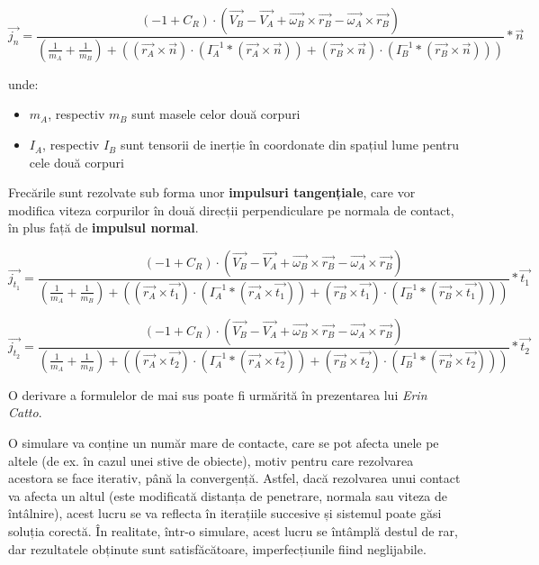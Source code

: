 \documentclass[12pt,a4paper]{report}
\begin{document}
$$ \vec{j_n} = \frac{\left(-1 + C_R\right) \cdot \left( \vec{V_B} - \vec{V_A} + \vec{\omega_B} \times \vec{r_B} - \vec{\omega_A} \times \vec{r_B} \right) }{\left(\frac{1}{m_A} + \frac{1}{m_B} \right) + \left(\left( \vec{r_A} \times \vec{n} \right) \cdot \left( I_{A}^{-1} * \left(\vec{r_A} \times \vec{n}\right)\right) + \left( \vec{r_B} \times \vec{n} \right) \cdot \left( I_{B}^{-1} * \left(\vec{r_B} \times \vec{n}\right)\right)  \right)} * \vec{n} $$

unde:
\begin{itemize}
	\item $m_A$, respectiv $m_B$ sunt masele celor două corpuri
	\item $I_{A}$, respectiv $I_{B}$ sunt tensorii de inerție în coordonate din spațiul lume pentru cele două corpuri
\end{itemize}

Frecările sunt rezolvate sub forma unor \textbf{impulsuri tangențiale}, care vor modifica viteza corpurilor în două direcții perpendiculare pe normala de contact, în plus față de \textbf{impulsul normal}.

$$ \vec{j_{t_1}} = \frac{\left(-1 + C_R\right) \cdot \left( \vec{V_B} - \vec{V_A} + \vec{\omega_B} \times \vec{r_B} - \vec{\omega_A} \times \vec{r_B} \right) }{\left(\frac{1}{m_A} + \frac{1}{m_B} \right) + \left(\left( \vec{r_A} \times \vec{t_1} \right) \cdot \left( I_{A}^{-1} * \left(\vec{r_A} \times \vec{t_1}\right)\right) + \left( \vec{r_B} \times \vec{t_1} \right) \cdot \left( I_{B}^{-1} * \left(\vec{r_B} \times \vec{t_1}\right)\right)  \right)} * \vec{t_1} $$

$$ \vec{j_{t_2}} = \frac{\left(-1 + C_R\right) \cdot \left( \vec{V_B} - \vec{V_A} + \vec{\omega_B} \times \vec{r_B} - \vec{\omega_A} \times \vec{r_B} \right) }{\left(\frac{1}{m_A} + \frac{1}{m_B} \right) + \left(\left( \vec{r_A} \times \vec{t_2} \right) \cdot \left( I_{A}^{-1} * \left(\vec{r_A} \times \vec{t_2}\right)\right) + \left( \vec{r_B} \times \vec{t_2} \right) \cdot \left( I_{B}^{-1} * \left(\vec{r_B} \times \vec{t_2}\right)\right)  \right)} * \vec{t_2} $$

O derivare a formulelor de mai sus poate fi urmărită în prezentarea lui \textit{Erin Catto}\cite{constraints_catto}.


O simulare va conține un număr mare de contacte, care se pot afecta unele pe altele (de ex. în cazul unei stive de obiecte), motiv pentru care rezolvarea acestora se face iterativ, până la convergență. Astfel, dacă rezolvarea unui contact va afecta un altul (este modificată distanța de penetrare, normala sau viteza de întâlnire), acest lucru se va reflecta în iterațiile succesive și sistemul poate găsi soluția corectă. În realitate, într-o simulare, acest lucru se întâmplă destul de rar, dar rezultatele obținute sunt satisfăcătoare, imperfecțiunile fiind neglijabile.
\end{document}
